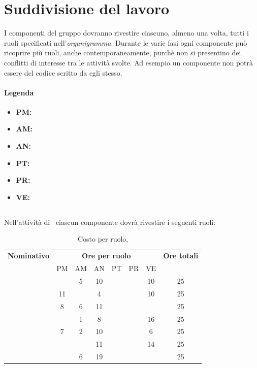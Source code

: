 \newpage
\section{Suddivisione del lavoro}
I componenti del gruppo dovranno rivestire ciascuno, almeno una volta, tutti i ruoli specificati nell'\textit{organigramma}.
Durante le varie fasi ogni componente può ricoprire più ruoli, anche contemporaneamente, purchè non si presentino dei conflitti di interesse tra le attività svolte. Ad esempio un componente non potrà essere \textit{\Ver} del codice scritto da egli stesso.
\paragraph{Legenda}
\begin{itemize}
\item\textbf{PM:} \Pm
\item\textbf{AM:} \Am
\item\textbf{AN:} \An
\item\textbf{PT:} \Prog
\item\textbf{PR:} \Progr
\item\textbf{VE:} \Ver
\end{itemize}
\subsection{\ARM}

Nell'attività di \ARM\ ciascun componente dovrà rivestire i seguenti ruoli:


\begin{table}[h]
	\begin{center}
		\begin{tabular}{|c|c|c|c|c|c|c|c|}
			\hline
			\textbf{Nominativo} & \multicolumn{6}{c|}{\textbf{Ore per ruolo}} & \textbf{Ore totali} \\
					& PM & AM & AN & PT & PR & VE & \\
			\hline
			\FB		&	 &	5 &	10 &  	&	 & 10 &	25	\\
			\hline
			\RM		& 11 &	  &	4  & 	&	 & 10 &	25	\\
			\hline
			\SL		& 8  & 6  &	11 &	&	 &	  &	25	\\
			\hline
			\DC		&	 & 1  &	8  &	&	 & 16 &	25	\\
			\hline
			\LD 	& 7	 & 2  &	10 &	&	 & 6  &	25	\\
			\hline
			\MT		& 	 &    &	11 &	&	 & 14 &	25	\\
			\hline
			\ND 	&	 & 6  &	19 &	&	 &	  & 25	\\
			\hline
		\end{tabular}
	\end{center}
	\caption{Costo per ruolo, \ARM}
\end{table}

